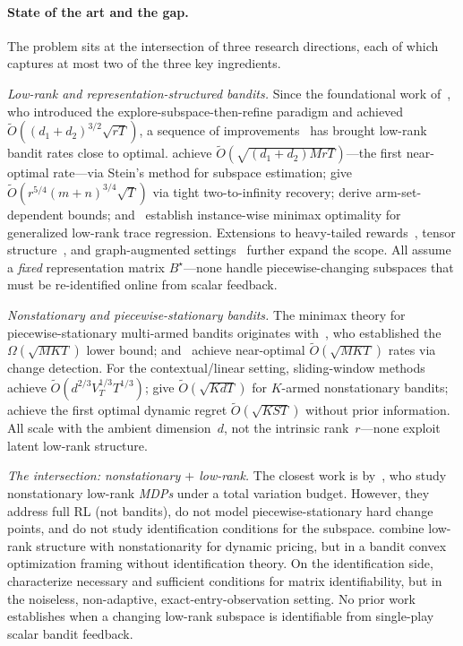 \documentclass[11pt]{article}
\begin{document}
\paragraph{State of the art and the gap.}
The problem sits at the intersection of three research directions, each of which
captures at most two of the three key ingredients.

\emph{Low-rank and representation-structured bandits.}
Since the foundational work of~\citet{jun2019bilinear}, who introduced
the explore-subspace-then-refine paradigm and achieved
$\widetilde{O}((d_1{+}d_2)^{3/2}\sqrt{rT})$, a sequence of
improvements~\citep{jang2021improved,kang2022gestt,lu2021lowrank,pmlr-v235-jedra24a,pmlr-v235-jang24e}
has brought low-rank bandit rates close to optimal.
\citet{kang2022gestt} achieve $\widetilde{O}(\sqrt{(d_1{+}d_2)MrT})$---the
first near-optimal rate---via Stein's method for subspace estimation;
\citet{pmlr-v235-jedra24a} give $\widetilde{O}(r^{5/4}(m{+}n)^{3/4}\sqrt{T})$
via tight two-to-infinity recovery;
\citet{pmlr-v235-jang24e} derive arm-set-dependent bounds;
and~\citet{lee2026gllowpopart} establish instance-wise minimax optimality for
generalized low-rank trace regression.
Extensions to heavy-tailed rewards~\citep{kang2024heavy},
tensor structure~\citep{stojanovic2024loraPI},
and graph-augmented settings~\citep{wang2025graph} further expand the scope.
All assume a \emph{fixed} representation matrix $B^\star$---none handle
piecewise-changing subspaces that must be re-identified online from scalar feedback.

\emph{Nonstationary and piecewise-stationary bandits.}
The minimax theory for piecewise-stationary multi-armed bandits
originates with~\citet{garivier2011upper}, who established the
$\Omega(\sqrt{MKT})$ lower bound;
\citet{cao2019nearly} and~\citet{besson2022efficient} achieve near-optimal
$\widetilde{O}(\sqrt{MKT})$ rates via change detection.
For the contextual/linear setting,
sliding-window methods~\citep{russac2019weighted,cheung2019learning} achieve
$\widetilde{O}(d^{2/3}V_T^{1/3}T^{1/3})$;
\citet{abbasi2023dynamic} give $\widetilde{O}(\sqrt{KdT})$ for $K$-armed
nonstationary bandits;
\citet{auer2019achieving} achieve the first optimal dynamic regret
$\widetilde{O}(\sqrt{KST})$ without prior information.
All scale with the ambient dimension~$d$, not the intrinsic rank~$r$---none
exploit latent low-rank structure.

\emph{The intersection: nonstationary $+$ low-rank.}
The closest work is by~\citet{cheng2023nonstationary}, who study
nonstationary low-rank \emph{MDPs} under a total variation budget.
However, they address full RL (not bandits), do not model piecewise-stationary
hard change points, and do not study identification conditions for the subspace.
\citet{mueller2019dynamic} combine low-rank structure with nonstationarity
for dynamic pricing, but in a bandit convex optimization framing without
identification theory.
On the identification side,~\citet{kiraly2012identifiability} characterize
necessary and sufficient conditions for matrix identifiability, but in the
noiseless, non-adaptive, exact-entry-observation setting.
No prior work establishes when a changing low-rank subspace is identifiable
from single-play scalar bandit feedback.
\end{document}
